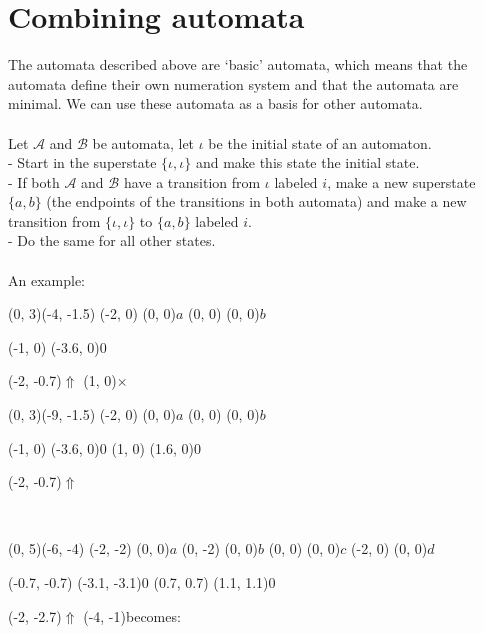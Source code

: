\documentclass{article}
\begin{document}
\section{Combining automata}
The automata described above are `basic' automata, which means that the 
automata define their own numeration system and that the automata are minimal.
We can use these automata as a basis for other automata.\\
\\
Let $\mathcal{A}$ and $\mathcal{B}$ be automata, let $\iota$ be the initial
state of an automaton.\\
- Start in the superstate $\{\iota, \iota\}$ and make this state the initial 
state.\\
- If both $\mathcal{A}$ and $\mathcal{B}$ have a transition from $\iota$ 
labeled $i$, make a new superstate $\{a, b\}$ (the endpoints of the transitions
in both automata) and make a new transition from $\{\iota, \iota\}$ to 
$\{a, b\}$ labeled $i$.\\
- Do the same for all other states.\\
\\
An example:\\
\begin{graph}(0, 3)(-4, -1.5)
  (-2, 0) (0, 0){$a$}
  (0, 0)  (0, 0){$b$}

  (-1, 0) \freetext(-3.6, 0){0}
   
   

  \freetext(-2, -0.7){$\Uparrow$}
  \freetext(1, 0){$\times$}
\end{graph}
\begin{graph}(0, 3)(-9, -1.5)
  (-2, 0) (0, 0){$a$}
  (0, 0)  (0, 0){$b$}

  (-1, 0) \freetext(-3.6, 0){0}
   
   
  (1, 0) \freetext(1.6, 0){0}

  \freetext(-2, -0.7){$\Uparrow$}
\end{graph}\\
\begin{graph}(0, 5)(-6, -4)
  (-2, -2) (0, 0){$a$}
  (0, -2)  (0, 0){$b$}
  (0, 0) (0, 0){$c$}
  (-2, 0)  (0, 0){$d$}

  (-0.7, -0.7) \freetext(-3.1, -3.1){0}
   
   
  (0.7, 0.7) \freetext(1.1, 1.1){0}
   
   

  \freetext(-2, -2.7){$\Uparrow$}
  \freetext(-4, -1){becomes:}
\end{graph}\\
\end{document}
